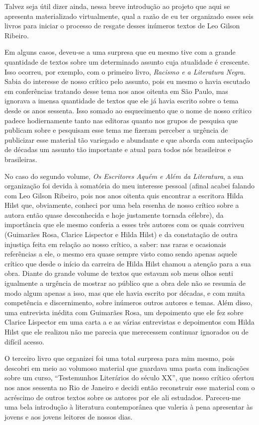 \documentclass[
  a4paper,
  oneside]{scrbook}
\begin{document}
Talvez seja útil dizer ainda, nessa breve introdução ao projeto que aqui
se apresenta materializado virtualmente, qual a razão de eu ter
organizado esses seis livros para iniciar o processo de resgate desses
inúmeros textos de Leo Gilson Ribeiro.

Em alguns casos, deveu-se a uma surpresa que eu mesmo tive com a grande
quantidade de textos sobre um determinado assunto cuja atualidade é
crescente. Isso ocorreu, por exemplo, com o primeiro livro,
\emph{Racismo e a Literatura Negra}. Sabia do interesse de nosso crítico
pelo assunto, pois eu mesmo o havia escutado em conferências tratando
desse tema nos anos oitenta em São Paulo, mas ignorava a imensa
quantidade de textos que ele já havia escrito sobre o tema desde os anos
sessenta. Isso somado ao esquecimento que o nome de nosso crítico padece
hodiernamente tanto nas editoras quanto nos grupos de pesquisa que
publicam sobre e pesquisam esse tema me fizeram perceber a urgência de
publicizar esse material tão variegado e abundante e que aborda com
antecipação de décadas um assunto tão importante e atual para todos nós
brasileiros e brasileiras.

No caso do segundo volume, \emph{Os Escritores Aquém e Além da
Literatura}, a sua organização foi devida à somatória do meu interesse
pessoal (afinal acabei falando com Leo Gilson Ribeiro, pois nos anos
oitenta quis encontrar a escritora Hilda Hilst que, obviamente, conheci
por uma bela resenha de nosso crítico sobre a autora então quase
desconhecida e hoje justamente tornada célebre), da importância que ele
mesmo conferia a esses três autores com os quais conviveu (Guimarães
Rosa, Clarice Lispector e Hilda Hilst) e da constatação de outra
injustiça feita em relação ao nosso crítico, a saber: nas raras e
ocasionais referências a ele, o mesmo era quase sempre visto como sendo
apenas aquele crítico que desde o início da carreira de Hilda Hilst
chamou a atenção para a sua obra. Diante do grande volume de textos que
estavam sob meus olhos senti igualmente a urgência de mostrar ao público
que a obra dele não se resumia de modo algum apenas a isso, mas que ele
havia escrito por décadas, e com muita competência e discernimento,
sobre inúmeros outros autores e temas. Além disso, uma entrevista
inédita com Guimarães Rosa, um depoimento que ele fez sobre Clarice
Lispector em uma carta a e as várias entrevistas e depoimentos com Hilda
Hilst que ele realizou não me parecia que merecessem continuar ignorados
ou de difícil acesso.

O terceiro livro que organizei foi uma total surpresa para mim mesmo,
pois descobri em meio ao volumoso material que guardava uma pasta com
indicações sobre um curso, ``Testemunhos Literários do século XX'', que
nosso crítico ofertou nos anos sessenta no Rio de Janeiro e decidi então
reconstruir esse material com o acréscimo de outros textos sobre os
autores por ele ali estudados. Pareceu-me uma bela introdução à
literatura contemporânea que valeria à pena apresentar às jovens e aos
jovens leitores de nossos dias.
\end{document}
